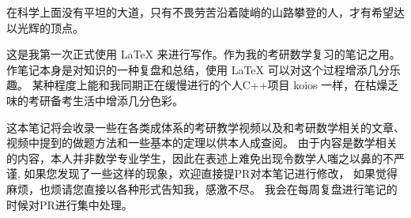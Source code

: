 \frontmatter
在科学上面没有平坦的大道，只有不畏劳苦沿着陡峭的山路攀登的人，才有希望达以光辉的顶点。

这是我第一次正式使用 \LaTeX{} 来进行写作。作为我的考研数学复习的笔记之用。
作笔记本身是对知识的一种复盘和总结，使用 \LaTeX{} 可以对这个过程增添几分乐趣。
某种程度上能和我同期正在缓慢进行的个人C++项目 koios 一样，在枯燥乏味的考研备考生活中增添几分色彩。

这本笔记将会收录一些在各类成体系的考研教学视频以及和考研数学相关的文章、
视频中提到的做题方法和一些基本的定理以供本人成查阅。
由于内容是数学相关的内容，本人并非数学专业学生，因此在表述上难免出现令数学人嗤之以鼻的不严谨,
如果您发现了一些这样的现象，欢迎直接提PR对本笔记进行修改，
如果觉得麻烦，也烦请您直接以各种形式告知我，感激不尽。
我会在每周复盘进行笔记的时候对PR进行集中处理。

